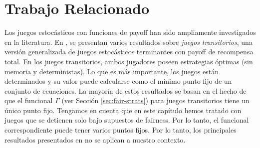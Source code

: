 
%


	
	
	

\section{Trabajo Relacionado} \label{sec:related_work}

Los juegos estocásticos con funciones de payoff han sido ampliamente investigados en la literatura. En \cite{FilarV96}, se presentan varios resultados sobre \emph{juegos transitorios},
una versión generalizada de juegos estocásticos terminantes con payoff de recompensa total.
En los juegos transitorios, ambos jugadores poseen estrategias óptimas (sin memoria y deterministas).
Lo que es más importante, los juegos están determinados y su valor puede calcularse como el mínimo punto fijo de un conjunto de ecuaciones.
La mayoría de estos resultados se basan en el hecho de que el funcional $\Gamma$ (ver Sección \ref{sec:fair-strats}) para juegos transitorios tiene un único punto fijo.
Tengamos en cuenta que en este capítulo hemos tratado con juegos que se detienen solo bajo supuestos de fairness. Por lo tanto, el funcional correspondiente
puede tener varios puntos fijos. Por lo tanto, los principales resultados presentados en \cite{FilarV96} no se aplican a nuestro contexto.

